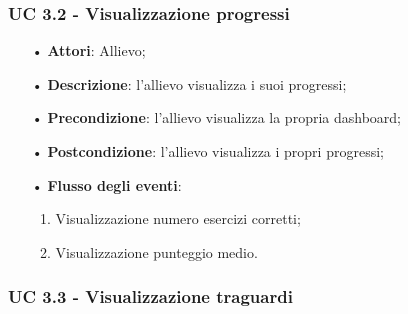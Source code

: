 \subsubsection{UC 3.2 - Visualizzazione progressi}
\begin{itemize}
\item[•]\textbf{Attori}: Allievo;
\item[•]\textbf{Descrizione}: l'allievo visualizza i suoi progressi;
\item[•]\textbf{Precondizione}: l'allievo visualizza la propria dashboard;
\item[•]\textbf{Postcondizione}: l'allievo visualizza i propri progressi;
\item[•]\textbf{Flusso degli eventi}:
\begin{enumerate}
	\item Visualizzazione numero esercizi corretti;
	\item Visualizzazione punteggio medio.
\end{enumerate}
\end{itemize}

\subsubsection{UC 3.3 - Visualizzazione traguardi}

